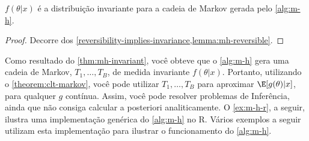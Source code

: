 \begin{theorem}
 \label{thm:mh-invariant}
 $f(\theta|x)$ é a distribuição invariante para
 a cadeia de Markov gerada pelo \cref{alg:m-h}.
\end{theorem}

\begin{proof}
 Decorre dos \cref{reversibility-implies-invariance,lemma:mh-reversible}.
\end{proof}

Como resultado do \cref{thm:mh-invariant}, 
você obteve que o \cref{alg:m-h} gera uma
cadeia de Markov, $T_{1},\ldots,T_{B}$, de 
medida invariante $f(\theta|x)$.
Portanto, utilizando o \cref{theorem:clt-markov}, 
você pode utilizar $T_{1},\ldots,T_{B}$ para
aproximar $\E[g(\theta)|x]$, para
qualquer $g$ contínua.
Assim, você pode resolver problemas de Inferência,
ainda que não consiga calcular a
posteriori analiticamente.
O \cref{ex:m-h-r}, a seguir, ilustra uma
implementação genérica do \cref{alg:m-h} no R.
Vários exemplos a seguir utilizam esta
implementação para ilustrar o funcionamento do
\cref{alg:m-h}.

